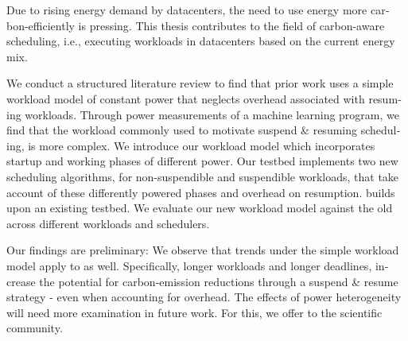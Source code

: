 
\null\vfil
\begin{otherlanguage}{english}
\begin{center}\textsf{\textbf{\abstractname}}\end{center}

\noindent
Due to rising energy demand by datacenters, the need to use energy more carbon-efficiently is pressing. This thesis contributes to the field of carbon-aware scheduling, i.e., executing workloads in datacenters based on the current energy mix.

We conduct a structured literature review to find that prior work uses a simple workload model of constant power that neglects overhead associated with resuming workloads.
Through power measurements of a machine learning program, we find that the workload commonly used to motivate suspend \& resuming scheduling, is more complex.
We introduce our workload model \modelname{} which incorporates startup and working phases of different power.
Our testbed \programname{} implements two new scheduling algorithms, for non-suspendible and suspendible workloads, that take account of these differently powered phases and overhead on resumption.
\programname{} builds upon an existing testbed.  
We evaluate our new workload model against the old across different workloads and schedulers.

Our findings are preliminary:
We observe that trends under the simple workload model apply to \modelname{} as well.
Specifically, longer workloads and longer deadlines, increase the potential for carbon-emission reductions through a suspend \& resume strategy - even when accounting for overhead.
The effects of power heterogeneity will need more examination in future work.
For this, we offer \programname{} to the scientific community.

\end{otherlanguage}
\vfil\null


